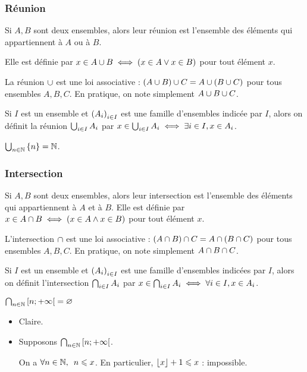 \subsubsection{Réunion}

Si \(A,B\) sont deux ensembles, alors leur réunion est l'ensemble des éléments qui appartiennent à \(A\) ou à \(B\).

Elle est définie par \(x\in A\cup B\iff\left(x\in A\lor x\in B\right)\) pour tout élément \(x\).

La réunion \(\cup\) est une loi associative : \(\left(A\cup B\right)\cup C=A\cup\left(B\cup C\right)\) pour tous ensembles \(A,B,C\). En pratique, on note simplement \(A\cup B\cup C\).

Si \(I\) est un ensemble et \(\left(A_i\right)_{i\in I}\) est une famille d'ensembles indicée par \(I\), alors on définit la réunion \(\bigcup_{i\in I}A_i\) par \(x\in\bigcup_{i\in I}A_i\iff\exists i\in I,x\in A_i\).

\begin{ex}
\(\bigcup_{n\in\mathbb{N}}\left\lbrace n\right\rbrace=\mathbb{N}\).
\end{ex}

\subsubsection{Intersection}

Si \(A,B\) sont deux ensembles, alors leur intersection est l'ensemble des éléments qui appartiennent à \(A\) et à \(B\). Elle est définie par \(x\in A\cap B\iff\left(x\in A\land x\in B\right)\) pour tout élément \(x\).

L'intersection \(\cap\) est une loi associative : \(\left(A\cap B\right)\cap C=A\cap\left(B\cap C\right)\) pour tous ensembles \(A,B,C\). En pratique, on note simplement \(A\cap B\cap C\).

Si \(I\) est un ensemble et \(\left(A_i\right)_{i\in I}\) est une famille d'ensembles indicées par \(I\), alors on définit l'intersection \(\bigcap_{i\in I}A_i\) par \(x\in\bigcap_{i\in I}A_i\iff\forall i\in I,x\in A_i\).

\begin{ex}
\(\bigcap_{n\in\mathbb{N}}\left[n;+\infty\right[=\varnothing\)
\end{ex}

\begin{dem}
\begin{itemize}
\item[\increc] Claire.

\item[\incdir] Supposons \(\bigcap_{n\in\mathbb{N}}\left[n;+\infty\right[\).

On a \(\quantifs{\forall n\in\N}n\leq x\). En particulier, \(\left\lfloor x\right\rfloor+1\leqslant x\) : impossible.
\end{itemize}
\end{dem}

